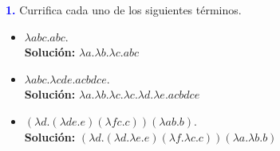 
\textbf{\textcolor{blue}{1.}} Currifica cada uno de los siguientes términos.

\begin{itemize}
\renewcommand{\theenumi}{\alph{enumi}}
\item $\lambda abc.abc$.\\
\textbf{Solución:}
$\lambda a. \lambda b. \lambda c. abc$
\item $\lambda abc. \lambda cde.acbdce$.\\
\textbf{Solución:}
$\lambda a.\lambda b.\lambda c.\lambda c.\lambda d.\lambda e.acbdce$
\item $(\lambda d.(\lambda de.e) (\lambda fc.c)) (\lambda ab.b)$.\\
\textbf{Solución:}
$(\lambda d.(\lambda d.\lambda e.e)(\lambda f.\lambda c.c))(\lambda a.\lambda b.b)$
\end{itemize}
